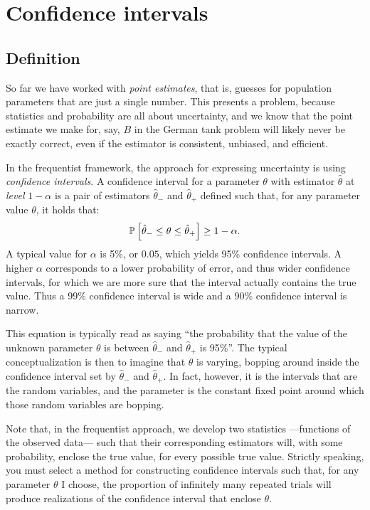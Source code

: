 
\chapter{Confidence intervals}

\section{Definition}

So far we have worked with \emph{point estimates}, that is, guesses for
population parameters that are just a single number. This presents a problem,
because statistics and probability are all about uncertainty, and we know that
the point estimate we make for, say, $B$ in the German tank problem will likely
never be exactly correct, even if the estimator is consistent, unbiased, and
efficient.

In the frequentist framework, the approach for expressing uncertainty is using
\emph{confidence intervals}. A confidence interval for a parameter $\theta$ with estimator $\hat{\theta}$
at \emph{level} $1-\alpha$ is a pair of estimators $\hat{\theta}_-$ and $\hat{\theta}_+$
defined such that, for any parameter value $\theta$, it holds that:
\begin{equation}
  \mathbb{P}\left[{\hat{\theta}_- \leq \theta \leq \hat{\theta}_+}\right] \geq 1 - \alpha.
\end{equation}
A typical value for $\alpha$ is 5\%, or $0.05$, which yields 95\% confidence intervals.
A higher $\alpha$ corresponds to a lower probability of error, and thus wider confidence
intervals, for which we are more sure that the interval actually contains the true value.
Thus a 99\% confidence interval is wide and a 90\% confidence interval is narrow.

This equation is typically read as saying ``the probability that the value of
the unknown parameter $\theta$ is between $\hat{\theta}_-$ and $\hat{\theta}_+$ is
95\%''. The typical conceptualization is then to imagine that $\theta$ is varying,
bopping around inside the confidence interval set by $\hat{\theta}_-$ and
$\hat{\theta}_+$. In fact, however, it is the intervals that are the random variables,
and the parameter is the constant fixed point around which those random variables
are bopping.

Note that, in the frequentist approach, we develop two statistics ---functions
of the observed data--- such that their corresponding estimators will, with some
probability, enclose the true value, for every possible true value. Strictly speaking,
you must select a method for constructing confidence intervals such that, for any
parameter $\theta$ I choose, the proportion of infinitely many repeated trials will
produce realizations of the confidence interval that enclose $\theta$.

